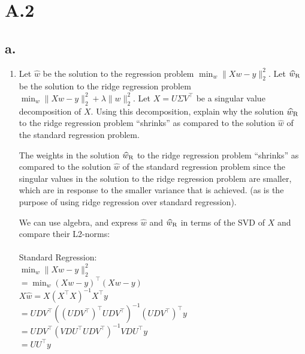 \documentclass{article}
\newcommand{\1}{\mathbf{1}}
\newcommand{\twonorm}[1]{\|#1\|_2^2}
\begin{document}
\section*{A.2}
{\Large

\subsection*{a.}

\begin{enumerate}
  \item Let $\widehat{w}$ be the solution to the regression problem $\min_{w} \twonorm{Xw - y}$. Let $\widehat{w}_{\rm R}$ be the solution to the ridge regression problem $\min_w \twonorm{X w - y} + \lambda \twonorm{w}$. Let $X = U \Sigma V^\top$ be a singular value decomposition of $X$. Using this decomposition, explain why the solution $\widehat{w}_{\rm R}$ to the ridge regression problem ``shrinks'' as compared to the solution $\widehat{w}$ of the standard regression problem.
  
  The weights in the solution $\widehat{w}_{\rm R}$ to the ridge regression problem ``shrinks'' as compared to the solution $\widehat{w}$ of the standard regression problem since the singular values in the solution to the ridge regression problem are smaller, which are in response to the smaller variance that is achieved. (as is the purpose of using ridge regression over standard regression).


  We can use algebra, and express $\widehat{w}$ and $\widehat{w}_{\rm R}$ in terms of the SVD of $X$ and compare their L2-norms: \\ \\
  Standard Regression: \\
  $\min_w \twonorm{X w - y}$ \\
  $= \min_w (Xw - y)^\top(Xw-y)$ \\
  $X\widehat{w} = X (X^\top X)^{-1}X^\top y$ \\
  $= UDV^\top ((UDV^\top)^\top UDV^\top)^{-1}(UDV^\top)^\top y$ \\
  $= UDV^\top (VDU^\top UDV^\top)^{-1}VDU^\top y$ \\
  $= UU^\top y$ \\


\end{enumerate}}
\end{document}
